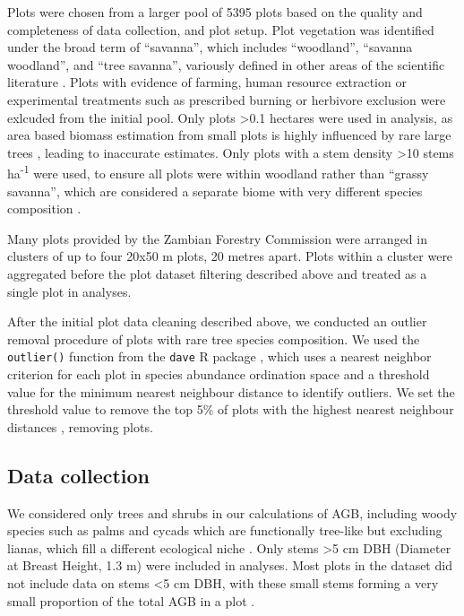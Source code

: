 \documentclass[11pt,a4paper]{article}
\begin{document}
Plots were chosen from a larger pool of 5395 plots based on the quality and completeness of data collection, and plot setup. Plot vegetation was identified under the broad term of ``savanna'', which includes ``woodland'', ``savanna woodland'', and ``tree savanna'', variously defined in other areas of the scientific literature \citep{}. Plots with evidence of farming, human resource extraction or experimental treatments such as prescribed burning or herbivore exclusion were exlcuded from the initial pool. Only plots >0.1 hectares were used in analysis, as area based biomass estimation from small plots is highly influenced by rare large trees \citep{}, leading to inaccurate estimates. Only plots with a stem density >10 stems ha\textsuperscript{-1} were used, to ensure all plots were within woodland rather than ``grassy savanna'', which are considered a separate biome with very different species composition \citep{Parr2014}.

Many plots provided by the Zambian Forestry Commission were arranged in clusters of up to four 20x50 m plots, 20 metres apart. Plots within a cluster were aggregated before the plot dataset filtering described above and treated as a single plot in analyses.

After the initial plot data cleaning described above, we conducted an outlier removal procedure of plots with rare tree species composition. We used the \verb|outlier()| function from the \verb|dave| R package \citep{dave}, which uses a nearest neighbor criterion for each plot in species abundance ordination space and a threshold value for the minimum nearest neighbour distance to identify outliers. We set the threshold value to remove the top 5\% of plots with the highest nearest neighbour distances \citep{Otto}, removing \noutliers{} plots.

\subsection{Data collection}
 
We considered only trees and shrubs in our calculations of AGB, including woody species such as palms and cycads which are functionally tree-like but excluding lianas, which fill a different ecological niche \citep{}. Only stems >5 cm DBH (Diameter at Breast Height, 1.3 m) were included in analyses. Most plots in the dataset did not include data on stems <5 cm DBH, with these small stems forming a very small proportion of the total AGB in a plot \citep{}.
\end{document}
